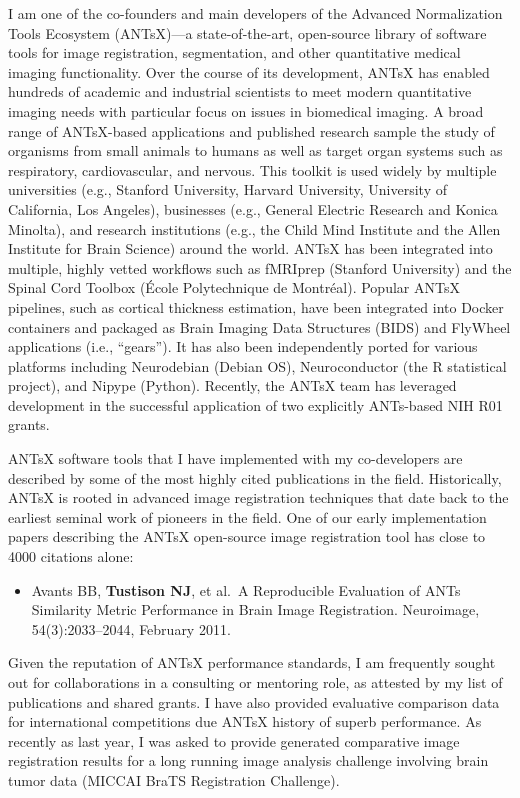 \documentclass[
  11pt,
]{article}
\providecommand{\tightlist}{%
  \setlength{\itemsep}{0pt}\setlength{\parskip}{0pt}}
\begin{document}
I am one of the co-founders and main developers of the Advanced
Normalization Tools Ecosystem (ANTsX)---a state-of-the-art, open-source
library of software tools for image registration, segmentation, and
other quantitative medical imaging functionality. Over the course of its
development, ANTsX has enabled hundreds of academic and industrial
scientists to meet modern quantitative imaging needs with particular
focus on issues in biomedical imaging. A broad range of ANTsX-based
applications and published research sample the study of organisms from
small animals to humans as well as target organ systems such as
respiratory, cardiovascular, and nervous. This toolkit is used widely by
multiple universities (e.g., Stanford University, Harvard University,
University of California, Los Angeles), businesses (e.g., General
Electric Research and Konica Minolta), and research institutions (e.g.,
the Child Mind Institute and the Allen Institute for Brain Science)
around the world. ANTsX has been integrated into multiple, highly vetted
workflows such as fMRIprep (Stanford University) and the Spinal Cord
Toolbox (École Polytechnique de Montréal). Popular ANTsX pipelines, such
as cortical thickness estimation, have been integrated into Docker
containers and packaged as Brain Imaging Data Structures (BIDS) and
FlyWheel applications (i.e., ``gears''). It has also been independently
ported for various platforms including Neurodebian (Debian OS),
Neuroconductor (the R statistical project), and Nipype (Python).
Recently, the ANTsX team has leveraged development in the successful
application of two explicitly ANTs-based NIH R01 grants.

ANTsX software tools that I have implemented with my co-developers are
described by some of the most highly cited publications in the field.
Historically, ANTsX is rooted in advanced image registration techniques
that date back to the earliest seminal work of pioneers in the field.
One of our early implementation papers describing the ANTsX open-source
image registration tool has close to 4000 citations alone:

\begin{itemize}
\tightlist
\item
  Avants BB, \textbf{Tustison NJ}, et al.~A Reproducible Evaluation of
  ANTs Similarity Metric Performance in Brain Image Registration.
  Neuroimage, 54(3):2033--2044, February 2011.
\end{itemize}

Given the reputation of ANTsX performance standards, I am frequently
sought out for collaborations in a consulting or mentoring role, as
attested by my list of publications and shared grants. I have also
provided evaluative comparison data for international competitions due
ANTsX history of superb performance. As recently as last year, I was
asked to provide generated comparative image registration results for a
long running image analysis challenge involving brain tumor data (MICCAI
BraTS Registration Challenge).
\end{document}
